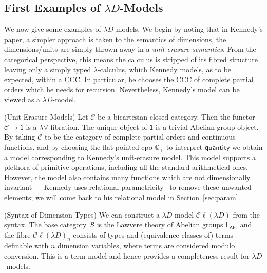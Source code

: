 \documentclass[a4paper,UKenglish]{lipics}
\newcommand{\ra}{\rightarrow}
\newcommand{\msf}[1]{\mathsf{#1}} %
\newcommand{\LAb}{\msf{L}_{\msf{Ab}}}
\newcommand{\terminal}{\msf{1}}
\newcommand{\ClLD}{\mathcal{C\ell}(\lambda{}D)} %
\newcommand{\B}{\mathcal{B}}
\newcommand{\C}{\mathcal{C}}
\newcommand{\bbQ}{\mathbb{Q}}
\newcommand{\qnt}{\msf{quantity}}
\begin{document}
\subsection{First Examples of $\lambda D$-Models}
We now give some examples of $\lambda D$-models. We begin by noting that in Kennedy's paper, a simpler approach is taken to the semantics of dimensions, the dimensions/units are simply thrown away in a {\em unit-erasure semantics}. From the categorical perspective, this means the calculus is stripped of its fibred structure leaving only a simply typed $\lambda$-calculus, which Kennedy models, as to be expected, within a CCC. In particular, he chooses the CCC of complete partial orders which he needs for recursion. Nevertheless, Kennedy's model can be viewed as a $\lambda D$-model.


\begin{example}(Unit Erasure Models)
\label{ex:UnitErasure}
Let $\C$ be a bicartesian closed category. Then the functor $\C \ra
\terminal$ is a $\lambda\forall$-fibration. The unique object of
$\terminal$ is a trivial Abelian group object. By taking $\C$ to be
the category of complete partial orders and continuous functions, and
by choosing the flat pointed cpo $\bbQ_{\bot}$ to interpret $\qnt$ we
obtain a model corresponding to Kennedy's unit-erasure model. This
model supports a plethora of primitive operations, including all the
standard arithmetical ones. However, the model also contains many
functions which are not dimensionally invariant --- Kennedy uses
relational parametricity~\cite{reynolds1983types} to remove these
unwanted elements; we will come back to his relational model in
Section~\ref{sec:param}.
\end{example}


\begin{example}(Syntax of Dimension Types)
We can construct a $\lambda D$-model $\ClLD$ from the syntax. The base category $\B$ is the Lawvere theory of Abelian groups $\LAb$, and the fibre $\ClLD_n$ consists of types and (equivalence classes of) terms definable with $n$ dimension variables, where terms are considered modulo conversion. This is a term model and hence provides a completeness result for $\lambda D$-models.
\end{example}
\end{document}
